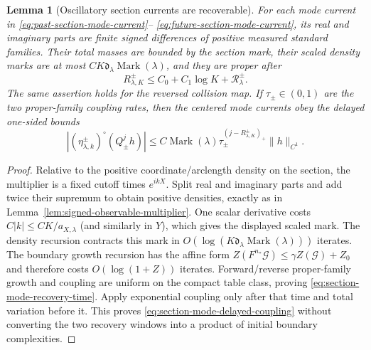 \documentclass[11pt]{article}
\newtheorem{lemma}[theorem]{Lemma}
\begin{document}
\begin{lemma}[Oscillatory section currents are recoverable]
\label{lem:oscillatory-section-recovery}
For each mode current in
\eqref{eq:past-section-mode-current}--
\eqref{eq:future-section-mode-current}, its real and imaginary parts are
finite signed differences of positive measured standard families.  Their
total masses are bounded by the section mark, their scaled density marks are
at most
$CK\mathfrak d_\lambda\operatorname{Mark}(\lambda)$, and they are proper after
\begin{equation}
\label{eq:section-mode-recovery-time}
 R_{\lambda,K}^{\pm}\le C_0+C_1\log K+\mathcal R_\lambda^\pm.
\end{equation}
The same assertion holds for the reversed collision map.
If $\tau_\pm\in(0,1)$ are the two proper-family coupling rates, then the
centered mode currents obey the delayed one-sided bounds
\begin{equation}
\label{eq:section-mode-delayed-coupling}
 |(\eta^\pm_{\lambda,k})^\circ(Q_\pm^jh)|
 \le C\operatorname{Mark}(\lambda)
 \tau_\pm^{(j-R_{\lambda,K}^\pm)_+}\|h\|_{C^1}.
\end{equation}
\end{lemma}

\begin{proof}
Relative to the positive coordinate/arclength density on the section, the
multiplier is a fixed cutoff times $e^{ikX}$.  Split real and imaginary parts
and add twice their supremum to obtain positive densities, exactly as in
Lemma~\ref{lem:signed-observable-multiplier}.  One scalar derivative costs
$C|k|\le CK/a_{X,\lambda}$ (and similarly in $Y$), which gives the displayed
scaled mark.  The density recursion contracts this mark in
$O(\log(K\mathfrak d_\lambda\operatorname{Mark}(\lambda)))$ iterates.  The
boundary growth recursion has the affine form
$Z(F^{n_*}\mathcal G)\le\gamma Z(\mathcal G)+Z_0$ and therefore costs
$O(\log(1+Z))$ iterates.  Forward/reverse proper-family growth and coupling
are uniform on the compact table class, proving
\eqref{eq:section-mode-recovery-time}.  Apply exponential coupling only after
that time and total variation before it.  This proves
\eqref{eq:section-mode-delayed-coupling} without converting the two recovery
windows into a product of initial boundary complexities.
\end{proof}
\end{document}
